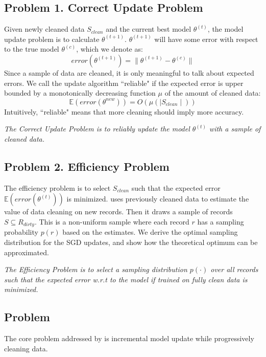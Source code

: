 \subsection{Problem 1. Correct Update Problem}\label{updp}
Given newly cleaned data $S_{clean}$ and the current best model $\theta^{(t)}$, the model update problem is to calculate $\theta^{(t+1)}$. 
$\theta^{(t+1)}$ will have some error with respect to the true model $\theta^{(c)}$, which we denote as:
\[
error(\theta^{(t+1)}) = \| \theta^{(t+1)} - \theta^{(c)} \|
\]
Since a sample of data are cleaned, it is only meaningful to talk about expected errors.
We call the update algorithm ``reliable" if the expected error is upper bounded by a monotonically decreasing function $\mu$ of the amount of cleaned data:
\[
\mathbb{E}(error(\theta^{new})) = O(\mu(\mid S_{clean} \mid))
\]
Intuitively, ``reliable" means that more cleaning should imply more accuracy.

\vspace{0.5em}

\emph{The Correct Update Problem is to reliably update the model $\theta^{(t)}$ with a sample of cleaned data.}

\subsection{Problem 2. Efficiency Problem}\label{optp}
The efficiency problem is to select $S_{clean}$ such that the expected error $\mathbb{E}(error(\theta^{(t)}))$ is minimized.
\sys uses previously cleaned data to estimate the value of data cleaning on new records.
Then it draws a sample of records $S \subseteq R_{dirty}$. 
This is a non-uniform sample where each record $r$ has a sampling probability $p(r)$ based on the estimates.
We derive the optimal sampling distribution for the SGD updates, and show how the theoretical optimum can be approximated.

\vspace{0.5em}

\emph{The Efficiency Problem is to select a sampling distribution $p(\cdot)$ over all records such that the expected error w.r.t to the model if trained on fully clean data is minimized.}

\iffalse
\subsection{\sys Problem}
The core problem addressed by \sys is incremental model update while progressively cleaning data.

